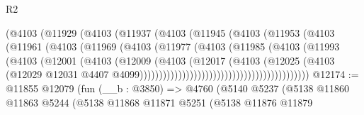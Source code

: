 \begin{lexlean}{R2}
\begin{coremodule}
                                    (@4103
                                      (@11929
                                        (@4103
                                          (@11937
                                            (@4103
                                              (@11945
                                                (@4103
                                                  (@11953
                                                    (@4103
                                                      (@11961
                                                        (@4103
                                                          (@11969
                                                            (@4103
                                                              (@11977
                                                                (@4103
                                                                  (@11985
                                                                    (@4103
                                                                      (@11993
                                                                        (@4103
                                                                          (@12001
                                                                            (@4103
                                                                              (@12009
                                                                                (@4103
                                                                                  (@12017
                                                                                    (@4103
                                                                                      (@12025
                                                                                        (@4103
                                                                                          (@12029
                                                                                            @12031
                                                                                            @4407
                                                                                            @4099))))))))))))))))))))))))))))))))))))))))))))
@12174 := @11855
    @12079
    (fun (__b : @3850) =>
    @4760
      (@5140
        @5237
        (@5138
          @11860
          @11863
          @5244
          (@5138
            @11868
            @11871
            @5251
            (@5138
              @11876
              @11879

\end{coremodule}
\end{lexlean}
